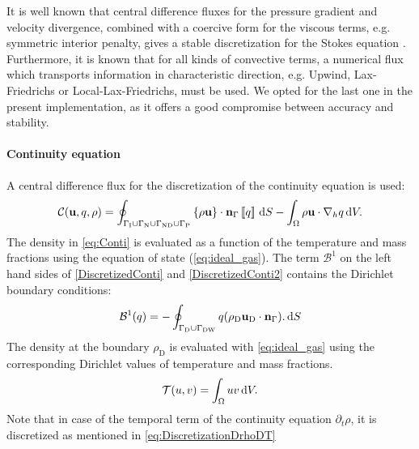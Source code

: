 It is well known that central difference fluxes for the pressure gradient and velocity divergence, combined with a coercive form for the viscous terms, e.g. symmetric interior penalty, gives a stable discretization for the Stokes equation \parencite{pietroMathematicalAspectsDiscontinuous2012,giraultDiscontinuousGalerkinMethod2004}. Furthermore, it is known that for all kinds of convective terms, a numerical flux which transports information in characteristic direction, e.g. Upwind, Lax-Friedrichs or Local-Lax-Friedrichs, must be used. We opted for the last one in the present implementation, as it offers a good compromise between accuracy and stability.
\paragraph{Continuity equation}
A central difference flux for the discretization of the continuity equation is used:
\begin{equation}
	\mathcal{C}(\textbf{u},q, \rho)  =  \oint_{\Gamma_{\text{I}} \cup\Gamma_{\text{N}}\cup \Gamma_{\text{ND}}\cup \Gamma_{\text{P}}}{\left\{{\rho\textbf{u} }\right\}\cdot \textbf{n}_\Gamma\left[\!\left[{{q}}\right]\!\right] \,\mathrm{d} S} - \int_{\Omega}{\rho \textbf{u}\cdot \nabla_h q} \,\mathrm{d} V.  \label{eq:Conti}
\end{equation}
The density in \cref{eq:Conti} is evaluated as a function of the temperature and mass fractions using the equation of state (\cref{eq:ideal_gas}). The term $\mathcal{B}^1$ on the left hand sides of \cref{DiscretizedConti} and \cref{DiscretizedConti2}  contains the Dirichlet boundary conditions:
\begin{equation}
	\mathcal{B}^1(q) =  -\oint_{\Gamma_{\text{D}}\cup \Gamma_{\text{DW}}}{q(\rho_{\text{D}} \textbf{u}_{\text{D}} \cdot \textbf{n}_{\Gamma}). \,\mathrm{d} S}
\end{equation}
The density at the boundary  $\rho_{\text{D}}$ is evaluated with \cref{eq:ideal_gas} using the corresponding Dirichlet values of temperature and mass fractions.
\begin{equation}
\mathcal{T}(u,v) =   \int_{\Omega}{uv} \,\mathrm{d} V.
\end{equation}
Note that in case of the temporal term of the continuity equation $\partial_t \rho$, it is discretized as mentioned in \cref{eq:DiscretizationDrhoDT}
